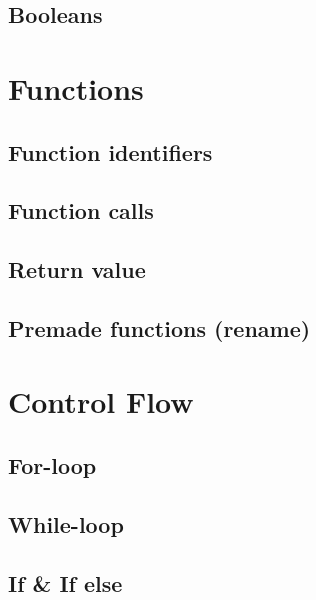 \subsection{Booleans}

\section{Functions}
\subsection{Function identifiers}

\subsection{Function calls}

\subsection{Return value}

\subsection{Premade functions (rename)}


\section{Control Flow}
\subsection{For-loop}

\subsection{While-loop}

\subsection{If \& If else}
